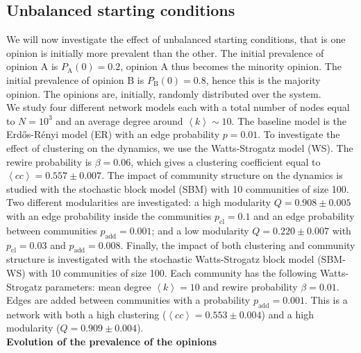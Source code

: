\documentclass[11 pt , letterpaper , twoside , openright]{book}
\begin{document}
\subsection{Unbalanced starting conditions}\label{20-80}

We will now investigate the effect of unbalanced starting conditions, that is one opinion is initially more prevalent than the other. The initial prevalence of opinion A is $P_\text{A}(0) = 0.2$, opinion A thus becomes the minority opinion. The initial prevalence of opinion B is $P_\text{B}(0) = 0.8$, hence this is the majority opinion. The opinions are, initially, randomly distributed over the system.\\ %
\newline
We study four different network models each with a total number of nodes equal to $N = 10^3$ and an average degree around $\left<k\right> \sim 10$. The baseline model is the Erd\H{o}s-R\'{e}nyi model (ER) with an edge probability $p = 0.01$. To investigate the effect of clustering on the dynamics, we use the Watts-Strogatz model (WS). The rewire probability is $\beta = 0.06$, which gives a clustering coefficient equal to $\left<cc\right> = 0.557 \pm 0.007$. The impact of community structure on the dynamics is studied with the stochastic block model (SBM) with 10 communities of size 100. Two different modularities are investigated: a high modularity $Q = 0.908 \pm 0.005$ with an edge probability inside the communities $p_{\text{cl}} = 0.1$ and an edge probability between communities $p_{\text{add}} = 0.001$; and a low modularity $Q = 0.220 \pm 0.007$ with $p_{\text{cl}} = 0.03$ and $p_{\text{add}} = 0.008$. Finally, the impact of both clustering and community structure is investigated with the stochastic Watts-Strogatz block model (SBM-WS) with 10 communities of size 100. Each community has the following Watts-Strogatz parameters: mean degree $\left<k\right> =10$ and rewire probability $\beta = 0.01$. Edges are added between communities with a probability $p_{\text{add}} = 0.001$. This is a network with both a high clustering ($\left<cc\right> = 0.553 \pm 0.004$) and a high modularity ($Q = 0.909 \pm 0.004$).\\
\newline
\textbf{Evolution of the prevalence of the opinions}\\
\end{document}
